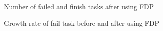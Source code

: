 \documentclass[12pt,oneside,openright,a4paper]{cpe-english-project}
\begin{document}
\begin{enumerate}
\begin{figure}[!h]
    \caption{Number of failed and finish tasks after using FDP}\label{fig:finfail1}
\end{figure}
\begin{figure}[!h]\centering
    \setlength{\fboxrule}{0mm} %
    \setlength{\fboxsep}{0cm}
    \caption{Growth rate of fail task before and after using FDP}\label{fig:fail1}
\end{figure}


\end{enumerate}
\end{document}
